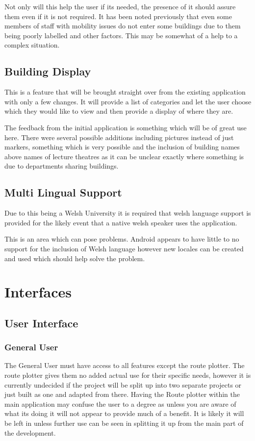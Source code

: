 Not only will this help the user if its needed, the presence of it should assure them even if it is not required. It has been noted previously that even some members of staff with mobility issues do not enter some buildings due to them being poorly labelled and other factors. This may be somewhat of a help to a complex situation.
\subsection{Building Display}
This is a feature that will be brought straight over from the existing application with only a few changes. It will provide a list of categories and let the user choose which they would like to view and then provide a display of where they are. 

The feedback from the initial application is something which will be of great use here. There were several possible additions including pictures instead of just markers, something which is very possible and the inclusion of building names above names of lecture theatres as it can be unclear exactly where something is due to departments sharing buildings. 
\subsection{Multi Lingual Support}
Due to this being a Welsh University it is required that welsh language support is provided for the likely event that a native welsh speaker uses the application.

This is an area which can pose problems. Android appears to have little to no support for the inclusion of Welsh language however new locales can be created and used which should help solve the problem. 

\section{Interfaces}
\subsection{User Interface}
\subsubsection{General User}
The General User must have access to all features except the route plotter. The route plotter gives them no added actual use for their specific needs, however it is currently undecided if the project will be split up into two separate projects or just built as one and adapted from there. Having the Route plotter within the main application may confuse the user to a degree as unless you are aware of what its doing it will not appear to provide much of a benefit. It is likely it will be left in unless further use can be seen in splitting it up from the main part of the development.

